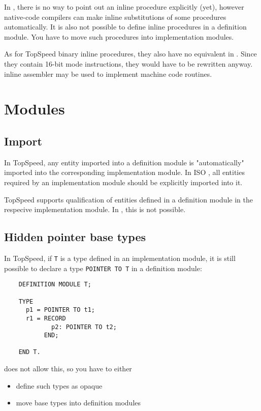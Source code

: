    In \xds{}, there is no way to point out an inline procedure explicitly 
    (yet), however native-code compilers can make inline substitutions of 
    some procedures automatically. It is also not possible to define inline
    procedures in a definition module. You have to move such procedures
    into implementation modules.

    As for TopSpeed binary inline procedures, they also have no equivalent 
    in \xds{}. Since they contain 16-bit mode instructions, they would have
    to be rewritten anyway. \xds{} inline assembler may be used to implement 
    machine code routines.

\section{Modules}

\subsection{Import}

    In TopSpeed, any entity imported into a definition module is "automatically" imported
    into the corresponding implementation module. In ISO \mt{}, all entities
    required by an implementation module should be explicitly imported into it.

    TopSpeed \mt{} supports qualification of entities defined in a definition
    module in the respecive implementation module. In \XDS{}, this is not 
    possible.

\subsection{Hidden pointer base types}

    In TopSpeed, if \verb'T' is a type defined in an implementation module,
    it is still possible to declare a type \verb'POINTER TO T' in a 
    definition module:

\begin{verbatim}
    DEFINITION MODULE T;
    
    TYPE 
      p1 = POINTER TO t1;
      r1 = RECORD
             p2: POINTER TO t2;
           END;
    
    END T.
\end{verbatim}

    \xds{} does not allow this, so you have to either
    \begin{itemize}
    \item define such types as opaque
    \item move base types into definition modules
    \end{itemize}

